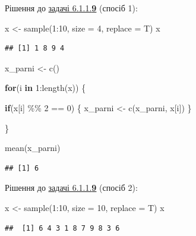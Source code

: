 \documentclass[
]{book}
\newenvironment{Shaded}{\begin{snugshade}}{\end{snugshade}}
\newcommand{\AttributeTok}[1]{\textcolor[rgb]{0.77,0.63,0.00}{#1}}
\newcommand{\ControlFlowTok}[1]{\textcolor[rgb]{0.13,0.29,0.53}{\textbf{#1}}}
\newcommand{\DecValTok}[1]{\textcolor[rgb]{0.00,0.00,0.81}{#1}}
\newcommand{\FunctionTok}[1]{\textcolor[rgb]{0.00,0.00,0.00}{#1}}
\newcommand{\NormalTok}[1]{#1}
\newcommand{\OtherTok}[1]{\textcolor[rgb]{0.56,0.35,0.01}{#1}}
\newcommand{\SpecialCharTok}[1]{\textcolor[rgb]{0.00,0.00,0.00}{#1}}
\begin{document}
Рішення до \protect\hyperlink{task6119}{задачі 6.1.1.\textbf{9}} (спосіб 1):

\begin{Shaded}
\begin{Highlighting}[]
\NormalTok{x }\OtherTok{\textless{}{-}} \FunctionTok{sample}\NormalTok{(}\DecValTok{1}\SpecialCharTok{:}\DecValTok{10}\NormalTok{, }\AttributeTok{size =} \DecValTok{4}\NormalTok{, }\AttributeTok{replace =}\NormalTok{ T)}
\NormalTok{x}
\end{Highlighting}
\end{Shaded}

\begin{verbatim}
## [1] 1 8 9 4
\end{verbatim}

\begin{Shaded}
\begin{Highlighting}[]
\NormalTok{x\_parni }\OtherTok{\textless{}{-}} \FunctionTok{c}\NormalTok{()}

\ControlFlowTok{for}\NormalTok{(i }\ControlFlowTok{in} \DecValTok{1}\SpecialCharTok{:}\FunctionTok{length}\NormalTok{(x)) \{}
  
  \ControlFlowTok{if}\NormalTok{(x[i] }\SpecialCharTok{\%\%} \DecValTok{2} \SpecialCharTok{==} \DecValTok{0}\NormalTok{) \{}
\NormalTok{    x\_parni }\OtherTok{\textless{}{-}} \FunctionTok{c}\NormalTok{(x\_parni, x[i])}
\NormalTok{  \}}
  
\NormalTok{\}}

\FunctionTok{mean}\NormalTok{(x\_parni)}
\end{Highlighting}
\end{Shaded}

\begin{verbatim}
## [1] 6
\end{verbatim}

Рішення до \protect\hyperlink{task6119}{задачі 6.1.1.\textbf{9}} (спосіб 2):

\begin{Shaded}
\begin{Highlighting}[]
\NormalTok{x }\OtherTok{\textless{}{-}} \FunctionTok{sample}\NormalTok{(}\DecValTok{1}\SpecialCharTok{:}\DecValTok{10}\NormalTok{, }\AttributeTok{size =} \DecValTok{10}\NormalTok{, }\AttributeTok{replace =}\NormalTok{ T)}
\NormalTok{x}
\end{Highlighting}
\end{Shaded}

\begin{verbatim}
##  [1] 6 4 3 1 8 7 9 8 3 6
\end{verbatim}
\end{document}
